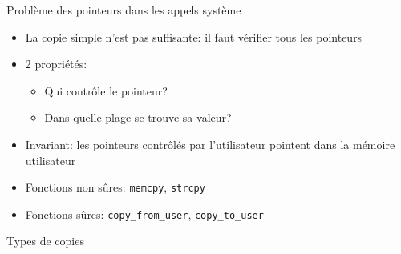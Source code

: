 \begin{frame}{Problème des pointeurs dans les appels système}

\begin{itemize}
    \item La copie simple n'est pas suffisante: il faut vérifier tous les pointeurs
    \item 2 propriétés:
    \begin{itemize}
        \item Qui contrôle le pointeur?
        \item Dans quelle plage se trouve sa valeur?
    \end{itemize}
    \item Invariant: les pointeurs contrôlés par l'utilisateur pointent dans la
        mémoire utilisateur
    \item Fonctions non sûres: \texttt{memcpy}, \texttt{strcpy}
    \item Fonctions sûres: \texttt{copy\_from\_user}, \texttt{copy\_to\_user}
\end{itemize}

\end{frame}

\begin{frame}{Types de copies}

    \centering

\end{frame}


